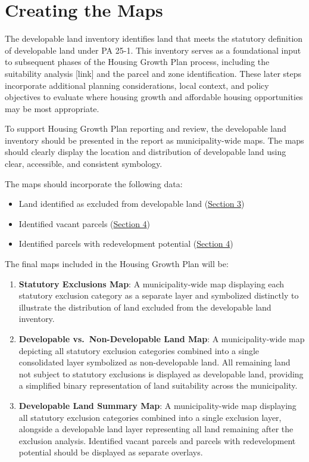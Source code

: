\documentclass[
  letterpaper,
  DIV=11,
  numbers=noendperiod]{scrreprt}
\providecommand{\tightlist}{%
  \setlength{\itemsep}{0pt}\setlength{\parskip}{0pt}}
\begin{document}

\chapter{Creating the Maps}\label{creating-the-maps}

The developable land inventory identifies land that meets the statutory
definition of developable land under PA 25-1. This inventory serves as a
foundational input to subsequent phases of the Housing Growth Plan
process, including the suitability analysis {[}link{]} and the parcel
and zone identification. These later steps incorporate additional
planning considerations, local context, and policy objectives to
evaluate where housing growth and affordable housing opportunities may
be most appropriate.

To support Housing Growth Plan reporting and review, the developable
land inventory should be presented in the report as municipality-wide
maps. The maps should clearly display the location and distribution of
developable land using clear, accessible, and consistent symbology.

The maps should incorporate the following data:

\begin{itemize}
\tightlist
\item
  Land identified as excluded from developable land
  (\hyperref[sec-statutory-exclusions]{Section 3})
\item
  Identified vacant parcels
  (\hyperref[identifying-vacant-and-potential-land-for-redevelopment]{Section
  4})
\item
  Identified parcels with redevelopment potential
  (\hyperref[identifying-vacant-and-potential-land-for-redevelopment]{Section
  4})
\end{itemize}

The final maps included in the Housing Growth Plan will be:

\begin{enumerate}
\def\labelenumi{\arabic{enumi}.}
\tightlist
\item
  \textbf{Statutory Exclusions Map}: A municipality-wide map displaying
  each statutory exclusion category as a separate layer and symbolized
  distinctly to illustrate the distribution of land excluded from the
  developable land inventory.
\item
  \textbf{Developable vs.~Non-Developable Land Map}: A municipality-wide
  map depicting all statutory exclusion categories combined into a
  single consolidated layer symbolized as non-developable land. All
  remaining land not subject to statutory exclusions is displayed as
  developable land, providing a simplified binary representation of land
  suitability across the municipality.
\item
  \textbf{Developable Land Summary Map}: A municipality-wide map
  displaying all statutory exclusion categories combined into a single
  exclusion layer, alongside a developable land layer representing all
  land remaining after the exclusion analysis. Identified vacant parcels
  and parcels with redevelopment potential should be displayed as
  separate overlays.
\end{enumerate}
\end{document}
